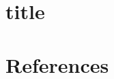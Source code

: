 \documentclass{rapport}
\begin{document}
\maketitle

\section{title}


\nocite{*}
\section{References}
\printbibliography[heading=none]
\newpage
\end{document}
